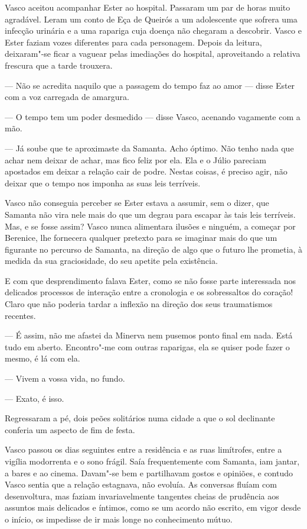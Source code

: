 Vasco aceitou acompanhar Ester ao hospital. Passaram um par de horas
muito agradável. Leram um conto de Eça de Queirós a um adolescente que
sofrera uma infecção urinária e a uma rapariga cuja doença não chegaram
a descobrir. Vasco e Ester faziam vozes diferentes para cada personagem.
Depois da leitura, deixaram"-se ficar a vaguear pelas imediações do
hospital, aproveitando a relativa frescura que a tarde trouxera.

--- Não se acredita naquilo que a passagem do tempo faz ao amor --- disse
  Ester com a voz carregada de amargura.

--- O tempo tem um poder desmedido --- disse Vasco, acenando vagamente com
  a mão.

--- Já soube que te aproximaste da Samanta. Acho óptimo. Não tenho nada
  que achar nem deixar de achar, mas fico feliz por ela. Ela e o Júlio
  pareciam apostados em deixar a relação cair de podre. Nestas coisas, é
  preciso agir, não deixar que o tempo nos imponha as suas leis
  terríveis.


Vasco não conseguia perceber se Ester estava a assumir, sem o dizer, que
Samanta não vira nele mais do que um degrau para escapar às tais leis
terríveis. Mas, e se fosse assim? Vasco nunca alimentara ilusões e
ninguém, a começar por Berenice, lhe fornecera qualquer pretexto para se
imaginar mais do que um figurante no percurso de Samanta, na direção de
algo
que o futuro lhe prometia, à medida da sua graciosidade, do seu apetite
pela existência.

E com que desprendimento falava Ester, como se não fosse parte
interessada nos delicados processos de interação entre a cronologia e
os sobressaltos do coração! Claro que não poderia tardar a inflexão na
direção dos seus traumatismos recentes.

--- É assim, não me afastei da Minerva nem pusemos ponto final em nada.
  Está tudo em aberto. Encontro"-me com outras raparigas, ela se quiser
  pode fazer o mesmo, é lá com ela.

--- Vivem a vossa vida, no fundo.

--- Exato, é isso.


Regressaram a pé, dois peões solitários numa cidade a que o sol
declinante conferia um aspecto de fim de festa.

Vasco passou os dias seguintes entre a residência e as ruas limítrofes,
entre a vigília modorrenta e o sono frágil. Saía frequentemente com
Samanta, iam jantar, a bares e ao cinema. Davam"-se bem e partilhavam
gostos e opiniões, e contudo Vasco sentia que a relação estagnava, não
evoluía. As conversas fluíam com desenvoltura, mas faziam
invariavelmente tangentes cheias de prudência aos assuntos mais
delicados e íntimos, como se um acordo não escrito, em vigor desde o
início, os impedisse de ir mais longe no conhecimento mútuo.


